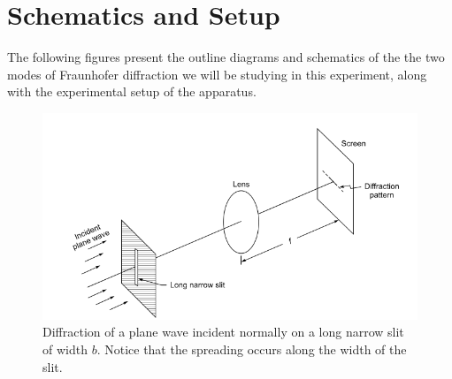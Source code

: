 \documentclass{article}
\begin{document}
\section{Schematics and Setup}
\noindent
The following figures present the outline diagrams and schematics of the the two modes of Fraunhofer diffraction we will be studying in this experiment, along with the experimental setup of the apparatus.
\begin{figure}
    \centering
    \includegraphics[scale = 0.65]{Figures/singleslit.png}
    \captionsetup{justification=centering}
    \caption{Diffraction of a plane wave incident normally on a long narrow slit of width $b$. Notice that the spreading occurs along the width of the slit.}
    \label{fig:snglslit}
\end{figure}
\end{document}
